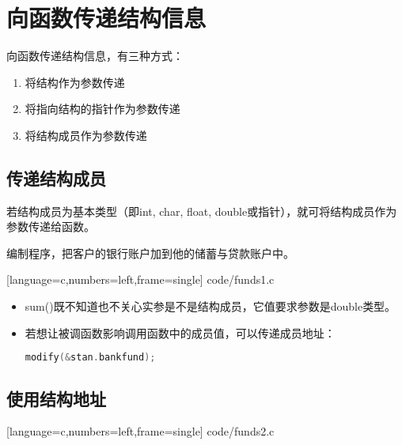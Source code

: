\section{向函数传递结构信息}

\begin{frame}[fragile]\ft{\secname}
向函数传递结构信息，有三种方式：
\begin{enumerate}
\item 将结构作为参数传递
\item 将指向结构的指针作为参数传递
\item 将结构成员作为参数传递
\end{enumerate}
\end{frame}

\subsection{传递结构成员}
\begin{frame}[fragile]\ft{\subsecname}
若结构成员为基本类型（即{\tf int, char, float, double}或指针），就可将结构成员作为参数传递给函数。
\end{frame}

\begin{frame}[fragile]\ft{\subsecname}
\begin{li}
  编制程序，把客户的银行账户加到他的储蓄与贷款账户中。
\end{li}
\end{frame}

\begin{frame}\ft{\subsecname}
  
  [language=c,numbers=left,frame=single]  
  {code/funds1.c}
\end{frame}


\begin{frame}[fragile]\ft{\subsecname}
  \begin{itemize}
  \item {\tf sum()}既不知道也不关心实参是不是结构成员，它值要求参数是{\tf double}类型。
  \item 若想让被调函数影响调用函数中的成员值，可以传递成员地址：
    \begin{lstlisting}[language=c,backgroundcolor=\color{red!20}]
modify(&stan.bankfund);
    \end{lstlisting}
  \end{itemize}
\end{frame}


\subsection{使用结构地址}
\begin{frame}\ft{\subsecname}
  
  [language=c,numbers=left,frame=single]  
  {code/funds2.c}
\end{frame}


